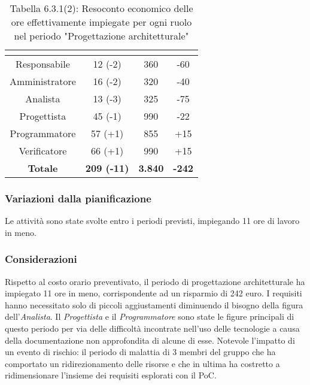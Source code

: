 \renewcommand{\arraystretch}{1.4}
\begin{table}[H]
\begin{center}
\begin{tabular}{|c|c|c|c|}
\hline
\rowcolor{title_row}
\textbf{\color{title_text}{Ruolo}}  & \textbf{\color{title_text}{Ore}} & \textbf{\color{title_text}{Costo in \euro}} & \textbf{\color{title_text}{Differenza al preventivo in \euro}} \\ \hline
Responsabile    & 12 (-2) & 360 & -60 \\ \hline
Amministratore  & 16 (-2) & 320 &  -40 \\ \hline
Analista        & 13 (-3) & 325 & -75 \\ \hline
Progettista     & 45 (-1) & 990 & -22 \\ \hline
Programmatore   & 57 (+1) & 855 & +15  \\ \hline
Verificatore    & 66 (+1) & 990 & +15  \\ \hline
\textbf{Totale} & \textbf{209 (-11)}    & \textbf{3.840} & \textbf{-242} \\ \hline
\end{tabular}
\caption{Tabella 6.3.1(2): Resoconto economico delle ore effettivamente impiegate per ogni ruolo nel periodo "Progettazione architetturale"\label{}}
\end{center}
\end{table}
\renewcommand{\arraystretch}{1}


\subsubsection{Variazioni dalla pianificazione}
Le attività sono state svolte entro i periodi previsti, impiegando 11 ore di lavoro in meno.

\subsubsection{Considerazioni}
Rispetto al costo orario preventivato, il periodo di progettazione architetturale ha impiegato 11 ore in meno, corrispondente ad un risparmio di 242 euro.
I requisiti hanno necessitato solo di piccoli aggiustamenti diminuendo il bisogno della figura dell'\emph{Analista}. Il \emph{Progettista} e il \emph{Programmatore} sono state le figure principali di questo periodo per via delle difficoltà incontrate nell'uso delle tecnologie a causa della documentazione non approfondita di alcune di esse.
Notevole l'impatto di un evento di rischio: il periodo di malattia di 3 membri del gruppo che ha comportato un ridirezionamento delle risorse e che in ultima ha costretto a ridimensionare l'insieme dei requisiti esplorati con il PoC.
\pagebreak
